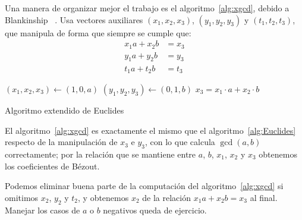   Una manera de organizar mejor el trabajo es el algoritmo~\ref{alg:xgcd},
  debido a Blankinship~%
    \cite{blankinship63:_new_version_euclid_algor}.%
  Usa vectores auxiliares
  \((x_1, x_2, x_3)\), \((y_1, y_2, y_3)\) y \((t_1, t_2, t_3)\),
  que manipula
  de forma que siempre se cumple que:
  \begin{align*}
    x_1 a + x_2 b &= x_3 \\
    y_1 a + y_2 b &= y_3 \\
    t_1 a + t_2 b &= t_3
  \end{align*}
  \begin{algorithm}[htbp]
    \DontPrintSemicolon

    \KwFunction {}\FuncSty{)} \;
    \BlankLine
    \((x_1, x_2, x_3) \leftarrow (1, 0, a)\) \;
    \((y_1, y_2, y_3) \leftarrow (0, 1, b)\) \;
    \Return \(x_3 = x_1 \cdot a + x_2 \cdot b\) \;
    \caption{Algoritmo extendido de Euclides}
    \label{alg:xgcd}
  \end{algorithm}
  El algoritmo~\ref{alg:xgcd} es exactamente el mismo
  que el algoritmo~\ref{alg:Euclides}
  respecto de la manipulación de \(x_3\) e \(y_3\),
  con lo que calcula \(\gcd(a, b)\) correctamente;
  por la relación que se mantiene
  entre \(a\), \(b\), \(x_1\), \(x_2\) y \(x_3\)
  obtenemos los coeficientes de Bézout.

  Podemos eliminar buena parte de la computación
  del algoritmo~\ref{alg:xgcd}
  si omitimos \(x_2\), \(y_2\) y \(t_2\),
  y obtenemos \(x_2\) de la relación \(x_1 a + x_2 b = x_3\)
  al final.
  Manejar los casos de \(a\) o \(b\) negativos queda de ejercicio.

